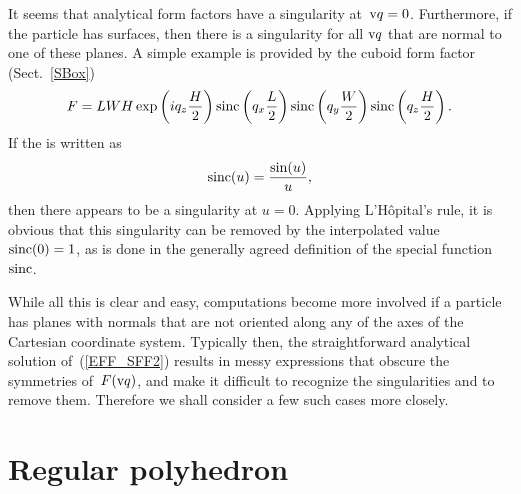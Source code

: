 %
It seems that  analytical form factors have a singularity at~$\text{v}{q}=0$.
Furthermore, if the particle has  surfaces,
then there is a singularity for all $\text{v}{q}$ that are normal to one of these planes.
A simple example is provided by the cuboid form factor (Sect.~\ref{SBox})
\begin{equation}
F= L W H\exp\left(i q_z \frac{H}{2}\right) \operatorname{sinc}\left(q_x \frac{L}{2}\right)
\operatorname{sinc}\left(q_y \frac{W}{2}\right) \operatorname{sinc}\left(q_z \frac{H}{2}\right).
\end{equation}
If the  is written as
\begin{equation}
  \operatorname{sinc}(u) = \frac{\sin(u)}{u},
\end{equation}
then there appears to be a singularity at $u=0$.
Applying L'Hôpital's rule, it is obvious
that this singularity can be removed by the interpolated value
$\operatorname{sinc}(0)=1$,
as is done in the generally agreed definition of the special function~$\operatorname{sinc}$.

While all this is clear and easy,
computations become more involved
if a particle has planes with normals that are not oriented along
any of the axes of the Cartesian coordinate system.
Typically then, the straightforward analytical solution of~(\ref{EFF_SFF2})
results in messy expressions that obscure the symmetries of~$F(\text{v}{q})$,
and make it difficult to recognize the singularities and
to remove them.
Therefore we shall consider a few such cases more closely.


\section{Regular polyhedron}

\def\tqx{\alpha} %
\def\tqy{\beta}  %

